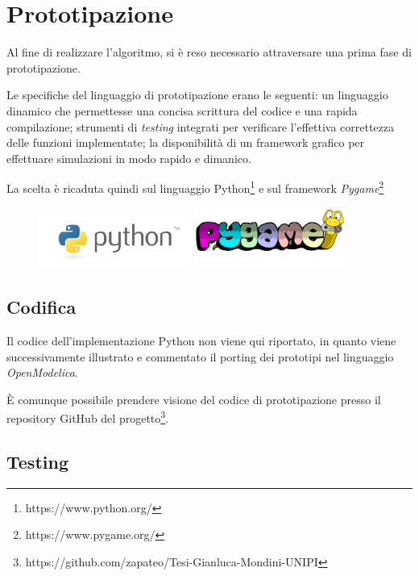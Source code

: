 \documentclass[11pt,a4paper]{report}
\begin{document}
\chapter{Prototipazione}

Al fine di realizzare l'algoritmo, si è reso necessario attraversare una prima fase di prototipazione.

Le specifiche del linguaggio di prototipazione erano le seguenti: un linguaggio dinamico che permettesse una concisa scrittura del codice e una rapida compilazione; strumenti di \textit{testing} integrati per verificare l'effettiva correttezza delle funzioni implementate; la disponibilità di un framework grafico per effettuare simulazioni in modo rapido e dimanico.

La scelta è ricaduta quindi sul linguaggio Python\footnote{https://www.python.org/} e sul framework \textit{Pygame}\footnote{https://www.pygame.org/}

\begin{figure}[H]
\centering
\includegraphics[width=5cm]{python.png}
\includegraphics[width=5cm]{pygame.png}

\end{figure}

\section{Codifica}

Il codice dell'implementazione Python non viene qui riportato, in quanto viene successivamente illustrato e commentato il porting dei prototipi nel linguaggio \textit{OpenModelica}.

È comunque possibile prendere visione del codice di prototipazione presso il repository GitHub del progetto\footnote{https://github.com/zapateo/Tesi-Gianluca-Mondini-UNIPI}.


\section{Testing}
\end{document}
